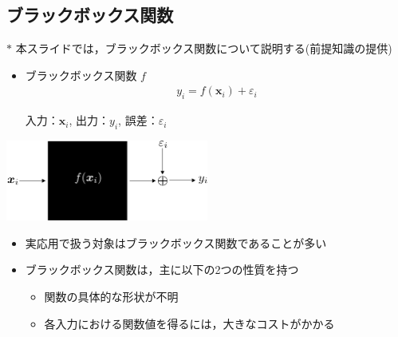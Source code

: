 \documentclass[dvipdfmx, 10.5pt]{beamer}
\begin{document}
\subsection{ブラックボックス関数}
\begin{frame}{\insertsubsection}
	$\ast$ 本スライドでは，ブラックボックス関数について説明する(前提知識の提供)

	\begin{itemize}
		\item ブラックボックス関数 $f$
		\begin{align*}
			y_i = f(\bm x_i) + \varepsilon_i
		\end{align*}
		\begin{center}
			入力：$\bm x_i$,\quad
			出力：$y_i$,\quad
			誤差：$\varepsilon_i$
		\end{center}
	\end{itemize}

	\begin{center}
		\includegraphics[width=0.50\textwidth]{./Fig/blackbox.pdf}
	\end{center}

	\begin{itemize}
		\item 実応用で扱う対象はブラックボックス関数であることが多い
		\item ブラックボックス関数は，主に以下の2つの性質を持つ
		\begin{itemize}
			\item 関数の具体的な形状が不明
			\item 各入力における関数値を得るには，大きなコストがかかる
		\end{itemize}

	\end{itemize}
\end{frame}

\end{document}
